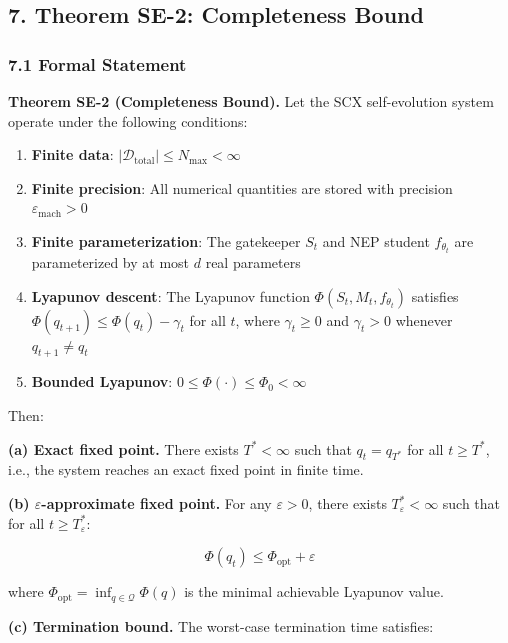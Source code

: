 \documentclass[
  12pt,
]{ctexart}
\providecommand{\tightlist}{%
  \setlength{\itemsep}{0pt}\setlength{\parskip}{0pt}}
\begin{document}
\subsection{7. Theorem SE-2: Completeness
Bound}\label{theorem-se-2-completeness-bound}

\subsubsection{7.1 Formal Statement}\label{formal-statement}

\textbf{Theorem SE-2 (Completeness Bound).} Let the SCX self-evolution
system operate under the following conditions:

\begin{enumerate}
\def\labelenumi{\arabic{enumi}.}
\tightlist
\item
  \textbf{Finite data}:
  \(|\mathcal{D}_{\text{total}}| \leq N_{\text{max}} < \infty\)
\item
  \textbf{Finite precision}: All numerical quantities are stored with
  precision \(\varepsilon_{\text{mach}} > 0\)
\item
  \textbf{Finite parameterization}: The gatekeeper \(S_t\) and NEP
  student \(f_{\theta_t}\) are parameterized by at most \(d\) real
  parameters
\item
  \textbf{Lyapunov descent}: The Lyapunov function
  \(\Phi(S_t, M_t, f_{\theta_t})\) satisfies
  \(\Phi(q_{t+1}) \leq \Phi(q_t) - \gamma_t\) for all \(t\), where
  \(\gamma_t \geq 0\) and \(\gamma_t > 0\) whenever \(q_{t+1} \neq q_t\)
\item
  \textbf{Bounded Lyapunov}: \(0 \leq \Phi(\cdot) \leq \Phi_0 < \infty\)
\end{enumerate}

Then:

\textbf{(a) Exact fixed point.} There exists \(T^* < \infty\) such that
\(q_t = q_{T^*}\) for all \(t \geq T^*\), i.e., the system reaches an
exact fixed point in finite time.

\textbf{(b) \(\varepsilon\)-approximate fixed point.} For any
\(\varepsilon > 0\), there exists \(T_\varepsilon^* < \infty\) such that
for all \(t \geq T_\varepsilon^*\):

\[\Phi(q_t) \leq \Phi_{\text{opt}} + \varepsilon\]

where \(\Phi_{\text{opt}} = \inf_{q \in \mathcal{Q}} \Phi(q)\) is the
minimal achievable Lyapunov value.

\textbf{(c) Termination bound.} The worst-case termination time
satisfies:
\end{document}

